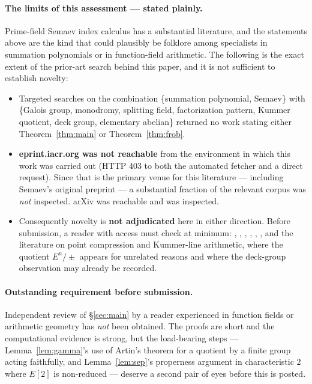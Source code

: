 \documentclass[11pt,a4paper]{article}
\theoremstyle{plain}
\theoremstyle{definition}
\begin{document}
\paragraph{The limits of this assessment --- stated plainly.}
Prime-field Semaev index calculus has a substantial literature, and the
statements above are the kind that could plausibly be folklore among specialists
in summation polynomials or in function-field arithmetic. The following is the
exact extent of the prior-art search behind this paper, and it is not sufficient
to establish novelty:
\begin{itemize}
\item Targeted searches on the combination \{summation polynomial, Semaev\} with
  \{Galois group, monodromy, splitting field, factorization pattern, Kummer
  quotient, deck group, elementary abelian\} returned no work stating either
  Theorem~\ref{thm:main} or Theorem~\ref{thm:frob}.
\item \textbf{eprint.iacr.org was not reachable} from the environment in which
  this work was carried out (HTTP 403 to both the automated fetcher and a direct
  request). Since that is the primary venue for this literature --- including
  Semaev's original preprint --- a substantial fraction of the relevant corpus
  was \emph{not} inspected. arXiv was reachable and was inspected.
\item Consequently novelty is \textbf{not adjudicated} here in either direction.
  Before submission, a reader with access must check at minimum:
  \cite{semaev2004}, \cite{gaudry2009}, \cite{diem2011}, \cite{fghr2014},
  \cite{gg2014}, \cite{ky2015}, and the literature on point compression and
  Kummer-line arithmetic, where the quotient $E^n/\pm$ appears for unrelated
  reasons and where the deck-group observation may already be recorded.
\end{itemize}

\paragraph{Outstanding requirement before submission.}
Independent review of \S\ref{sec:main} by a reader experienced in function fields
or arithmetic geometry has \emph{not} been obtained. The proofs are short and the
computational evidence is strong, but the load-bearing steps ---
Lemma~\ref{lem:gamma}'s use of Artin's theorem for a quotient by a finite group
acting faithfully, and Lemma~\ref{lem:sep}'s properness argument in characteristic
$2$ where $E[2]$ is non-reduced --- deserve a second pair of eyes before this is
posted.
\end{document}
